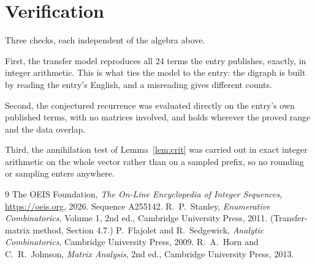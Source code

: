 \documentclass[11pt,a4paper]{article}
\theoremstyle{plain}
\theoremstyle{definition}
\begin{document}
\section{Verification}

Three checks, each independent of the algebra above.

First, the transfer model reproduces all $24$ terms the entry publishes, exactly, in
integer arithmetic. This is what ties the model to the entry: the digraph is built by reading
the entry's English, and a misreading gives different counts.

Second, the conjectured recurrence was evaluated directly on the entry's own published terms,
with no matrices involved, and holds wherever the proved range and the data overlap.

Third, the annihilation test of Lemma~\ref{lem:crit} was carried out in exact integer
arithmetic on the whole vector rather than on a sampled prefix, so no rounding or sampling
enters anywhere.

\begin{thebibliography}{9}
 The OEIS Foundation, \emph{The On-Line Encyclopedia of Integer
Sequences}, \url{https://oeis.org}, 2026. Sequence A255142.
 R.~P.~Stanley, \emph{Enumerative Combinatorics}, Volume 1, 2nd ed.,
Cambridge University Press, 2011. (Transfer-matrix method, Section 4.7.)
 P.~Flajolet and R.~Sedgewick, \emph{Analytic Combinatorics}, Cambridge
University Press, 2009.
 R.~A.~Horn and C.~R.~Johnson, \emph{Matrix Analysis}, 2nd ed., Cambridge
University Press, 2013.
\end{thebibliography}
\end{document}
